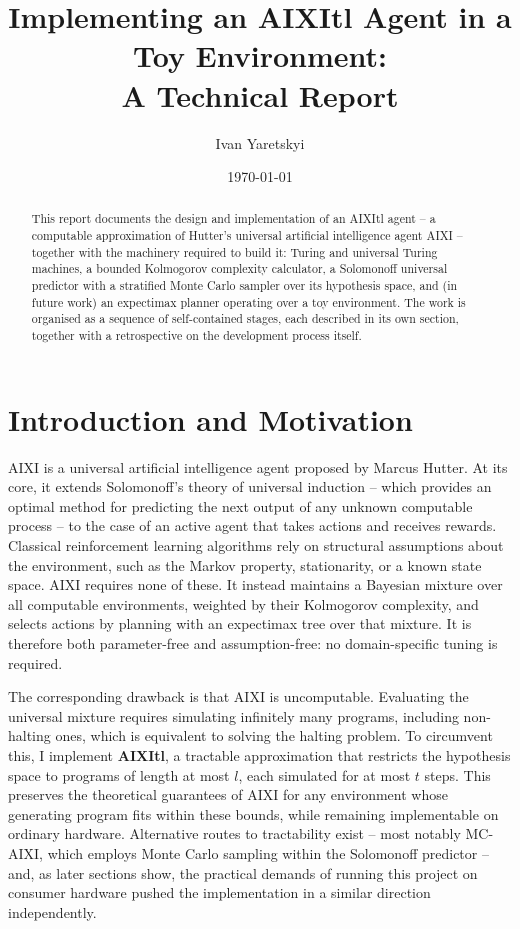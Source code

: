 \documentclass[11pt]{article}
\title{Implementing an AIXItl Agent in a Toy Environment:\\ A Technical Report}
\author{Ivan Yaretskyi}
\date{\today}
\begin{document}
\maketitle

\begin{abstract}
This report documents the design and implementation of an AIXItl agent -- a
computable approximation of Hutter's universal artificial intelligence agent AIXI --
together with the machinery required to build it: Turing and universal Turing machines,
a bounded Kolmogorov complexity calculator, a Solomonoff universal predictor with a
stratified Monte Carlo sampler over its hypothesis space, and (in future work) an
expectimax planner operating over a toy environment. The work is organised as a sequence
of self-contained stages, each described in its own section, together with a retrospective
on the development process itself.
\end{abstract}

\section{Introduction and Motivation}
\label{sec:introduction}

AIXI is a universal artificial intelligence agent proposed by Marcus Hutter. At its core,
it extends Solomonoff's theory of universal induction -- which provides an optimal method
for predicting the next output of any unknown computable process -- to the case of an
active agent that takes actions and receives rewards. Classical reinforcement learning
algorithms rely on structural assumptions about the environment, such as the Markov
property, stationarity, or a known state space. AIXI requires none of these. It instead
maintains a Bayesian mixture over all computable environments, weighted by their
Kolmogorov complexity, and selects actions by planning with an expectimax tree over that
mixture. It is therefore both parameter-free and assumption-free: no domain-specific
tuning is required.

The corresponding drawback is that AIXI is uncomputable. Evaluating the universal mixture
requires simulating infinitely many programs, including non-halting ones, which is
equivalent to solving the halting problem. To circumvent this, I implement \textbf{AIXItl},
a tractable approximation that restricts the hypothesis space to programs of length at
most $l$, each simulated for at most $t$ steps. This preserves the theoretical guarantees
of AIXI for any environment whose generating program fits within these bounds, while
remaining implementable on ordinary hardware. Alternative routes to tractability
exist -- most notably MC-AIXI, which employs Monte Carlo sampling within the Solomonoff
predictor -- and, as later sections show, the practical demands of running this project on
consumer hardware pushed the implementation in a similar direction independently.
\end{document}
